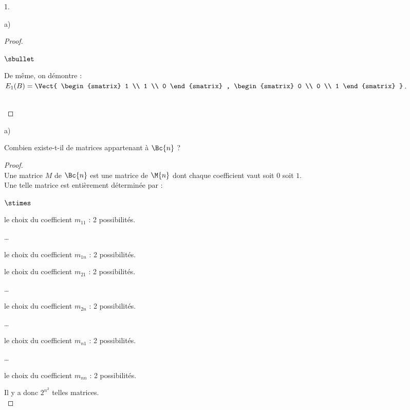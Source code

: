\begin{noliste}{1.}
\begin{noliste}{a)}
\begin{proof}
\begin{remark}
\begin{noliste}{$\sbullet$}
          \item De même, on démontre : $E_{1}(B) =
            \Vect{ \begin{smatrix}
                1 \\
                1 \\
                0
              \end{smatrix}
              , 
              \begin{smatrix}
                0 \\
                0 \\
                1
              \end{smatrix}
            }$.
          \end{noliste}
        \end{remark}~\\[-1.4cm]
      \end{proof}
    \end{noliste}


\newpage


\item 
  \begin{noliste}{a)}
    \setlength{\itemsep}{2mm}
  \item Combien existe-t-il de matrices appartenant à $\Bc{n}$ ?
	
    \begin{proof}~\\%
      Une matrice $M$ de $\Bc{n}$ est une matrice de $\M{n}$ dont
      chaque coefficient vaut soit $0$ soit $1$.\\
      Une telle matrice est entièrement déterminée par :
      \begin{noliste}{$\stimes$}
      \item le choix du coefficient $m_{11}$ : 2 possibilités.
      \item \ldots
      \item le choix du coefficient $m_{1n}$ : 2 possibilités.
      \item le choix du coefficient $m_{21}$ : 2 possibilités.
      \item \ldots
      \item le choix du coefficient $m_{2n}$ : 2 possibilités.
      \item \ldots
      \item le choix du coefficient $m_{n1}$ : 2 possibilités.
      \item \ldots
      \item le choix du coefficient $m_{nn}$ : 2 possibilités.
      \end{noliste}
      Il y a donc $2^{n^2}$ telles matrices.%
      ~\\[-1cm]
    \end{proof}
    

\end{noliste}
\end{noliste}
